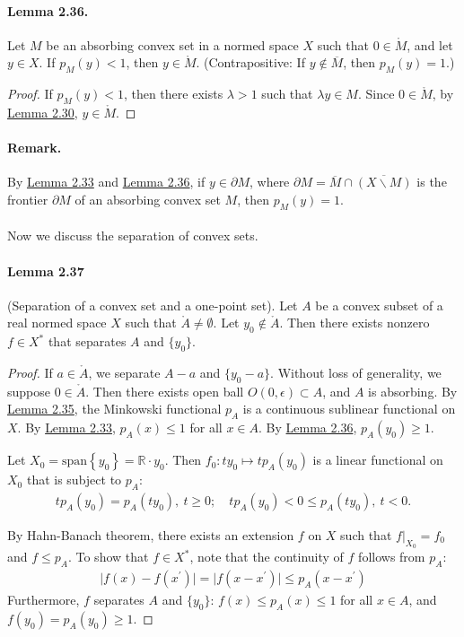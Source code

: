 \documentclass{article}
\begin{document}
\paragraph{Lemma 2.36.\label{lemma:2.36}} Let $M$ be an absorbing convex set in a normed space $X$ such that $0\in\mathring{M}$, and let $y\in X$. If $p_M(y)<1$, then $y\in\mathring{M}$. (Contrapositive: If $y\notin\overline{M}$, then $p_M(y)=1$.)
\begin{proof}
If $p_M(y)<1$, then there exists $\lambda>1$ such that $\lambda y\in M$. Since $0\in\mathring{M}$, by \hyperref[lemma:2.30]{Lemma 2.30}, $y\in\mathring{M}$.
\end{proof}

\paragraph{Remark.} By \hyperref[lemma:2.33]{Lemma 2.33} and \hyperref[lemma:2.36]{Lemma 2.36}, if $y\in\partial M$, where $\partial M=\overline{M}\cap\overline{(X\backslash M)}$ is the frontier $\partial M$ of an absorbing convex set $M$, then $p_M(y)=1$.

\paragraph{} Now we discuss the separation of convex sets.
\paragraph{Lemma 2.37\label{lemma:2.37}} (Separation of a convex set and a one-point set). Let $A$ be a convex subset of a real normed space $X$ such that $\mathring{A}\neq\emptyset$. Let $y_0\notin\mathring{A}$. Then there exists nonzero $f\in X^*$ that separates $A$ and $\{y_0\}$.
\begin{proof}
If $a\in\mathring{A}$, we separate $A-a$ and $\{y_0-a\}$. Without loss of generality, we suppose $0\in\mathring{A}$. Then there exists open ball $O(0,\epsilon)\subset A$, and $A$ is absorbing. By \hyperref[lemma:2.35]{Lemma 2.35}, the Minkowski functional $p_A$ is a continuous sublinear functional on $X$. By \hyperref[lemma:2.33]{Lemma 2.33}, $p_A(x)\leq 1$ for all $x\in A$. By \hyperref[lemma:2.36]{Lemma 2.36}, $p_A(y_0)\geq 1$.

Let $X_0=\mathrm{span}\left\{y_0\right\} = \mathbb{R}\cdot y_0$. Then $f_0:ty_0\mapsto tp_A(y_0)$ is a linear functional on $X_0$ that is subject to $p_A$:
\begin{align*}
	tp_A(y_0) = p_A(ty_0),\ t\geq 0;\quad
	tp_A(y_0) < 0 \leq p_A(ty_0),\ t<0.
\end{align*}

By Hahn-Banach theorem, there exists an extension $f$ on $X$ such that $f|_{X_0}=f_0$ and $f\leq p_A$. To show that $f\in X^*$, note that the continuity of $f$ follows from $p_A$:
\begin{align*}
	\vert f(x) - f(x^\prime)\vert = \vert f(x - x^\prime)\vert \leq p_A(x-x^\prime)
\end{align*}
Furthermore, $f$ separates $A$ and $\{y_0\}$: $f(x)\leq p_A(x)\leq 1$ for all $x\in A$, and $f(y_0) = p_A(y_0) \geq 1$.
\end{proof}
\end{document}

